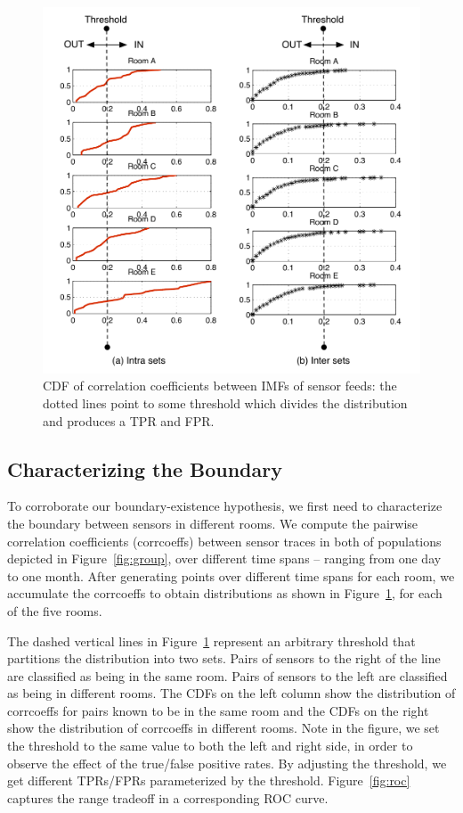 \begin{figure}[h!]
\centering
	\includegraphics[width=1.0\textwidth]{figs/corrcoeff_cdf_in_out}
\caption{CDF of correlation coefficients between IMFs of sensor feeds: the dotted lines point to some threshold which divides
 the distribution and produces a TPR and FPR.
}
\label{fig:cdf}
\end{figure}

\subsection{Characterizing the Boundary}
To corroborate our boundary-existence hypothesis, we first need to characterize the boundary between sensors in different rooms. 
We compute the pairwise correlation coefficients (corrcoeffs) between sensor traces in both of populations depicted in Figure~\ref{fig:group}, 
over different time spans -- ranging from one day to one month.
After generating points over different time 
spans for each room, we accumulate the corrcoeffs to obtain distributions as shown in Figure~\ref{fig:cdf}, for each of the five rooms. 

The dashed vertical lines in Figure~\ref{fig:cdf} 
represent an arbitrary threshold that partitions the distribution into two sets.  Pairs of sensors to the right of the line
are classified as being in the same room.  Pairs of sensors to the left are classified as being in different rooms.
The CDFs on the left column show the distribution of corrcoeffs for pairs known to be in the same room and the CDFs on the right
show the distribution of corrcoeffs in different rooms.
Note in the figure, we set the threshold to the same value to both the left and right side, in order to observe the effect of the true/false positive
rates.
By adjusting the threshold, we get different TPRs/FPRs parameterized by the threshold. Figure~\ref{fig:roc} captures the range tradeoff in a corresponding ROC curve.


